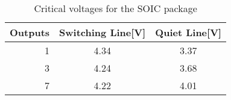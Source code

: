 \documentclass[../main.tex]{subfiles}
\begin{document}
\newpage

\begin{table}[h]
    \centering
    \begin{tabular}{r|c c}
        \toprule[1pt]
        \textbf{Outputs} & \textbf{Switching Line[V]} &\textbf{Quiet Line[V]} \\
        \midrule
        1  & 4.34  & 3.37 \\
        3  & 4.24  & 3.68 \\
        7  & 4.22  & 4.01  \\
        \bottomrule[1pt]
    \end{tabular}
    \caption{Critical voltages for the SOIC package}
\end{table}
\end{document}
